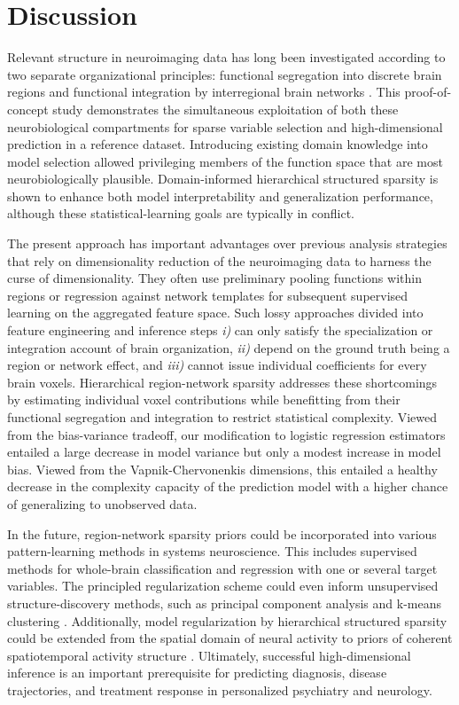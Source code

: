 \documentclass{article}
\begin{document}
\section{Discussion}
Relevant structure in neuroimaging data has long been investigated
according to two separate organizational principles:
functional segregation into discrete brain regions
\cite{passingham2002}
and functional integration by interregional brain networks
\cite{sporns14nn}.
%
This proof-of-concept study demonstrates the simultaneous exploitation of
both these neurobiological compartments
for sparse variable selection and high-dimensional prediction
in a reference dataset.
%
Introducing existing domain knowledge into model selection
allowed privileging members of the function space
that are most neurobiologically plausible.
%
Domain-informed hierarchical structured sparsity is shown to enhance
both model interpretability and generalization performance,
although these statistical-learning goals are typically in conflict.



The present approach has important advantages over previous
analysis strategies that rely on dimensionality reduction of
the neuroimaging data to harness the curse of dimensionality.
They often use preliminary pooling functions within regions
or regression against network templates
for subsequent supervised learning on the aggregated feature space.
Such lossy approaches divided into feature engineering and inference steps
\textit{i)} can only satisfy the specialization or
integration account of brain organization,
\textit{ii)} depend on the ground truth being a region or network effect,
and
\textit{iii)} cannot issue individual coefficients for every brain voxels.
%
Hierarchical region-network sparsity addresses these shortcomings
by estimating individual voxel contributions
while benefitting from their functional segregation and integration
to restrict statistical complexity.
%
Viewed from the bias-variance tradeoff,
our modification to logistic regression estimators
entailed a large decrease in model variance but only a modest
increase in model bias.
Viewed from the Vapnik-Chervonenkis dimensions,
this entailed a healthy decrease in the complexity capacity of the prediction model
with a higher chance of generalizing to unobserved data.



In the future,
region-network sparsity priors could be incorporated into various
pattern-learning methods in systems neuroscience.
%
This includes supervised methods for whole-brain classification and regression
with one or several target variables.
The principled regularization scheme could even inform
unsupervised structure-discovery methods,
such as principal component analysis
\cite{jenatton2009structured}
and
k-means clustering \cite{witten2010framework}.
%
Additionally,
model regularization by hierarchical structured sparsity could be extended
from the spatial domain of neural activity to
priors of coherent spatiotemporal activity structure
\cite{gramfort2011tracking}.
%
Ultimately,
successful high-dimensional inference is
an important prerequisite
for predicting diagnosis,
disease trajectories, and treatment response
in personalized psychiatry and neurology.
\end{document}
